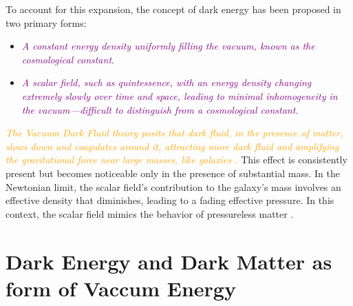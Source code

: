 \documentclass{sciposter}
\begin{document}
\begin{multicols}{3}
To account for this expansion, the concept of dark energy has been proposed in two primary forms:
\begin{itemize}
\item \textcolor{purple}{\textit{A constant energy density uniformly filling the vacuum, known as the cosmological constant}.}
\item \textcolor{purple}{\textit{A scalar field, such as quintessence, with an energy density changing extremely slowly over time and space, leading to minimal inhomogeneity in the vacuum—difficult to distinguish from a cosmological constant.}}
\end{itemize}
\textcolor{orange}{\textit{The Vacuum Dark Fluid theory posits that dark fluid, in the presence of matter, slows down and coagulates around it, attracting more dark fluid and amplifying the gravitational force near large masses, like galaxies \cite{Astrophysics_Betts}.}} This effect is consistently present but becomes noticeable only in the presence of substantial mass. {In the Newtonian limit, the scalar field's contribution to the galaxy's mass involves an effective density that diminishes, leading to a fading effective pressure.} In this context, the scalar field mimics the behavior of pressureless matter \cite{Arbey_2006}.
\section{{Dark Energy and Dark Matter as form of Vaccum Energy}}

\end{multicols}
\end{document}
